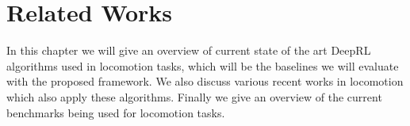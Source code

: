 

\chapter{Related Works}
\label{ch:relatedWorks}




In this chapter we will give an overview of current state of the art DeepRL algorithms
used in locomotion tasks, which will be the baselines we will evaluate with the proposed
framework. We also discuss various recent works in locomotion which also apply 
these algorithms. Finally we give an overview of the current benchmarks being
used for locomotion tasks.



